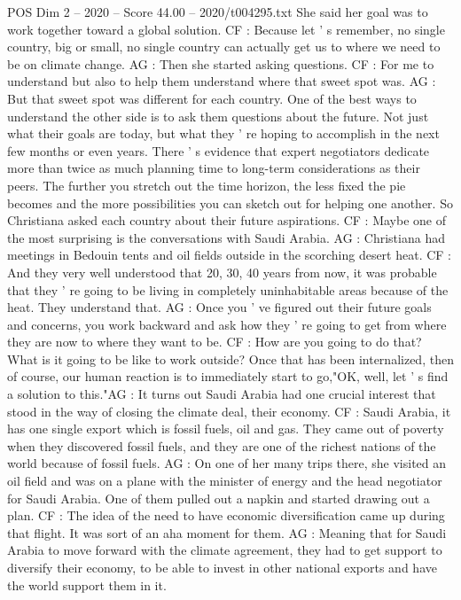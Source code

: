 \begin{textsample}{POS Dim 2 – 2020 – Score 44.00 – 2020/t004295.txt}
She said her goal was to work together toward a global solution.
CF : Because let ' s remember, no single country, big or small, no single country can actually get us to where we need to be on climate change.
AG : Then she started asking questions.
CF : For me to understand but also to help them understand where that sweet spot was.
AG : But that sweet spot was different for each country.
One of the best ways to understand the other side is to ask them questions about the future.
Not just what their goals are today, but what they ' re hoping to accomplish in the next few months or even years.
There ' s evidence that expert negotiators dedicate more than twice as much planning time to long-term considerations as their peers.
The further you stretch out the time horizon, the less fixed the pie becomes and the more possibilities you can sketch out for helping one another.
So Christiana asked each country about their future aspirations.
CF : Maybe one of the most surprising is the conversations with Saudi Arabia.
AG : Christiana had meetings in Bedouin tents and oil fields outside in the scorching desert heat.
CF : And they very well understood that 20, 30, 40 years from now, it was probable that they ' re going to be living in completely uninhabitable areas because of the heat.
They understand that.
AG : Once you ' ve figured out their future goals and concerns, you work backward and ask how they ' re going to get from where they are now to where they want to be.
CF : How are you going to do that?
What is it going to be like to work outside?
Once that has been internalized, then of course, our human reaction is to immediately start to go,"OK, well, let ' s find a solution to this."AG : It turns out Saudi Arabia had one crucial interest that stood in the way of closing the climate deal, their economy.
CF : Saudi Arabia, it has one single export which is fossil fuels, oil and gas.
They came out of poverty when they discovered fossil fuels, and they are one of the richest nations of the world because of fossil fuels.
AG : On one of her many trips there, she visited an oil field and was on a plane with the minister of energy and the head negotiator for Saudi Arabia.
One of them pulled out a napkin and started drawing out a plan.
CF : The idea of the need to have economic diversification came up during that flight.
It was sort of an aha moment for them.
AG : Meaning that for Saudi Arabia to move forward with the climate agreement, they had to get support to diversify their economy, to be able to invest in other national exports and have the world support them in it.

\end{textsample}
